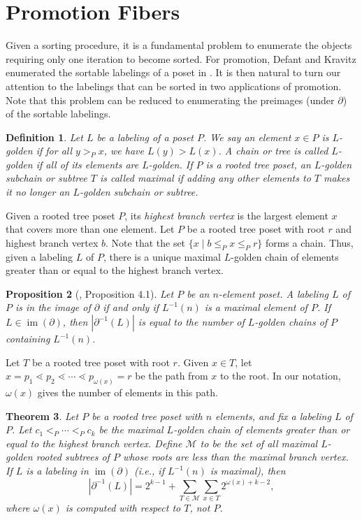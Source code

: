 \documentclass[11pt]{amsart}
\newtheorem{thm}{Theorem}[section]
\newtheorem{prop}[thm]{Proposition}
\newtheorem{Definition}[thm]{Definition}
\newenvironment{definition}
{\begin{Definition}\rm}{\end{Definition}}
\theoremstyle{definition}
\DeclareMathOperator{\im}{\mathrm{im}}
\newcommand{\inverse}{^{-1}}
\begin{document}
\section{Promotion Fibers}\label{Promotion Fibers}
Given a sorting procedure, it is a fundamental problem to enumerate the objects requiring only one iteration to become sorted. For promotion, Defant and Kravitz enumerated the sortable labelings of a poset in \cite{DK20}. It is then natural to turn our attention to the labelings that can be sorted in two applications of promotion. Note that this problem can be reduced to enumerating the preimages (under $ \partial $) of the sortable labelings.
\begin{definition}
	Let $ L $ be a labeling of a poset $ P $. We say an element $ x\in P $ is \emph{$ L $-golden} if for all $ y>_Px $, we have $ L(y)>L(x) $. A chain or tree is called $ L $-golden if all of its elements are $ L $-golden. If $ P $ is a rooted tree poset, an $ L $-golden subchain or subtree $ T $ is called \emph{maximal} if adding any other elements to $ T $ makes it no longer an $ L $-golden subchain or subtree.
\end{definition}
Given a rooted tree poset $ P $, its \emph{highest branch vertex} is the largest element $ x $ that covers more than one element. Let $ P $ be a rooted tree poset with root $ r $ and highest branch vertex $ b $. Note that the set $ \{x\;|\;b\leq_P x\leq_Pr\} $ forms a chain. Thus, given a labeling $ L $ of $ P $, there is a unique maximal $ L $-golden chain of elements greater than or equal to the highest branch vertex.
\begin{prop}[\cite{DK20}, Proposition 4.1]\label{L-golden}
	Let $ P $ be an $ n $-element poset. A labeling $ L $ of $ P $ is in the image of $ \partial $ if and only if $ L\inverse(n) $ is a maximal element of $ P $. If $ L\in\im(\partial) $, then $ |\partial\inverse(L)| $ is equal to the number of $ L $-golden chains of $ P $ containing $ L\inverse(n) $. 
\end{prop}
Let $ T $ be a rooted tree poset with root $ r $. Given $ x\in T $, let $ x=p_1\lessdot p_2\lessdot\cdots\lessdot p_{\omega(x)}=r $ be the path from $ x $ to the root. In our notation, $ \omega(x) $ gives the number of elements in this path.
\begin{thm}\label{fiber}
	Let $ P $ be a rooted tree poset with $ n $ elements, and fix a labeling $ L $ of $ P $. Let $ c_1<_P\cdots<_Pc_k $ be the maximal $ L $-golden chain of elements greater than or equal to the highest branch vertex. Define $ \mathcal{M} $ to be the set of all maximal $ L $-golden rooted subtrees of $ P $ whose roots are less than the maximal branch vertex. %
	If $ L $ is a labeling in $ \im(\partial) $ (i.e., if $ L\inverse(n) $ is maximal), then \[|\partial\inverse(L)|=2^{k-1}+\sum_{T\in\mathcal{M}}\sum_{x\in T}2^{\omega(x)+k-2},\] where $ \omega(x) $ is computed with respect to $ T $, not $ P $. 
\end{thm}
\end{document}
